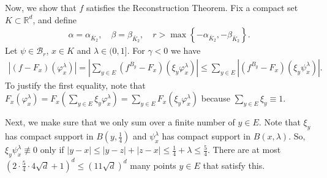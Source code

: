 Now, we show that \(f\) satisfies the Reconstruction Theorem. Fix a compact set \(K \subset \mathbb{R}^d\), and define 
\begin{align}\label{tropicalGeometryie}
    \alpha = \alpha_{\bar K_2}, \quad \beta = \beta_{\bar K_2}, \quad r > \max\left\{ -\alpha_{\bar K_2}, -\beta_{\bar K_2} \right\}.
\end{align}
Let \(\psi \in \mathcal{B}_r\), \(x \in K\) and \(\lambda \in (0,1]\). For \(\gamma < 0\) we have
\begin{align}\label{AbbaHunter}
    |(f-F_x)(\varphi^\lambda_x)| = |\sum_{y \in E} (f^{B_y} - F_x)(\xi_y \varphi^\lambda_x)| \leq \sum_{y \in E} | (f^{B_y} - F_x)(\xi_y \psi^\lambda_x) |.
\end{align} 
To justify the first equality, note that \(F_x(\varphi^\lambda_x) = F_x(\sum_{y \in E} \xi_y \varphi^\lambda_x) = \sum_{y \in E}F_x(\xi_y \varphi^\lambda_x)\) because \(\sum_{y \in E}\xi_y \equiv 1\).

Next, we make sure that we only sum over a finite number of \(y \in E\). Note that \(\xi_y\) has compact support in \(B(y, \frac{1}{4})\) and \(\psi^\lambda_x\) has compact support in \(B(x, \lambda)\). So, \(\xi_y \psi^\lambda_x \not \equiv 0\) only if \(|y-x| \leq |y - z| + |z-x| \leq \frac{1}{4} + \lambda \leq \frac{5}{4}\). There are at most \((2 \cdot \frac{5}{4} \cdot 4 \sqrt{d} + 1)^d \leq (11 \sqrt{d})^d\) many points \(y \in E\) that satisfy this. 

